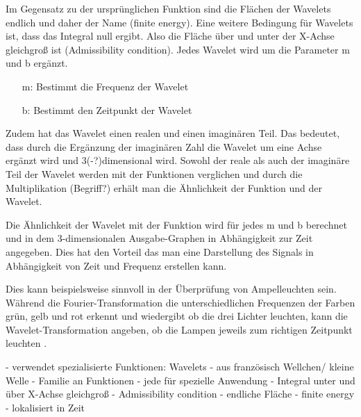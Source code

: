 Im Gegensatz zu der ursprünglichen Funktion sind die Flächen der Wavelets endlich und daher der Name (finite energy). Eine weitere Bedingung für Wavelets ist, dass das Integral null ergibt. Also die Fläche über und unter der X-Achse gleichgroß ist (Admissibility condition). Jedes Wavelet wird um die Parameter m und b ergänzt.

%
\begin{itemize}
    \item[m:] Bestimmt die Frequenz der Wavelet
    \item[b:] Bestimmt den Zeitpunkt der Wavelet
\end{itemize}
%

Zudem hat das Wavelet einen realen und einen imaginären Teil. Das bedeutet, dass durch die Ergänzung der imaginären Zahl die Wavelet um eine Achse ergänzt wird und 3(-?)dimensional wird. Sowohl der reale als auch der imaginäre Teil der Wavelet werden mit der Funktionen verglichen und durch die Multiplikation (Begriff?) erhält man die Ähnlichkeit der Funktion und der Wavelet.

\par

Die Ähnlichkeit der Wavelet mit der Funktion wird für jedes m und b berechnet und in dem 3-dimensionalen Ausgabe-Graphen in Abhängigkeit zur Zeit angegeben. Dies hat den Vorteil das man eine Darstellung des Signals in Abhängigkeit von Zeit und Frequenz erstellen kann.

\par

Dies kann beispielsweise sinnvoll in der Überprüfung von Ampelleuchten sein. Während die Fourier-Transformation die unterschiedlichen Frequenzen der Farben grün, gelb und rot erkennt und wiedergibt ob die drei Lichter leuchten, kann die Wavelet-Transformation angeben, ob die Lampen jeweils zum richtigen Zeitpunkt leuchten \parencite{wavelets}.

%
 - verwendet spezialisierte Funktionen: Wavelets
 - aus französisch Wellchen/ kleine Welle
 - Familie an Funktionen
   - jede für spezielle Anwendung
 - Integral unter und über X-Achse gleichgroß
   - Admissibility condition
 - endliche Fläche
   - finite energy
   - lokalisiert in Zeit